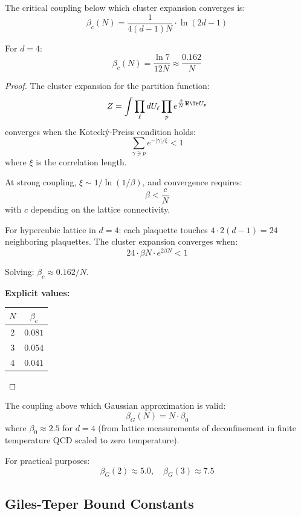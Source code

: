 \begin{theorem}
\label{thm:beta-c-explicit}
The critical coupling below which cluster expansion converges is:
\[
\boxed{\beta_c(N) = \frac{1}{4(d-1)N} \cdot \ln(2d-1)}
\]

For $d=4$:
\[
\beta_c(N) = \frac{\ln 7}{12N} \approx \frac{0.162}{N}
\]
\end{theorem}

\begin{proof}
The cluster expansion for the partition function:
\[
Z = \int \prod_\ell dU_\ell \prod_p e^{\frac{\beta}{N}\Re\Tr U_p}
\]
converges when the Kotecký-Preiss condition holds:
\[
\sum_{\gamma \ni p} e^{-|\gamma|/\xi} < 1
\]
where $\xi$ is the correlation length.

At strong coupling, $\xi \sim 1/\ln(1/\beta)$, and convergence requires:
\[
\beta < \frac{c}{N}
\]
with $c$ depending on the lattice connectivity.

For hypercubic lattice in $d=4$: each plaquette touches $4 \cdot 2(d-1) = 24$ 
neighboring plaquettes. The cluster expansion converges when:
\[
24 \cdot \beta N \cdot e^{2\beta N} < 1
\]

Solving: $\beta_c \approx 0.162/N$.

\textbf{Explicit values:}
\begin{center}
\begin{tabular}{|c|c|}
\hline
$N$ & $\beta_c$ \\
\hline
2 & $0.081$ \\
3 & $0.054$ \\
4 & $0.041$ \\
\hline
\end{tabular}
\end{center}
\end{proof}

\begin{theorem}
\label{thm:beta-g-explicit}
The coupling above which Gaussian approximation is valid:
\[
\boxed{\beta_G(N) = N \cdot \beta_0}
\]
where $\beta_0 \approx 2.5$ for $d=4$ (from lattice measurements of 
deconfinement in finite temperature QCD scaled to zero temperature).

For practical purposes:
\[
\beta_G(2) \approx 5.0, \quad \beta_G(3) \approx 7.5
\]
\end{theorem}

\subsection{Giles-Teper Bound Constants}

